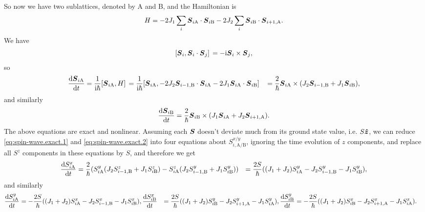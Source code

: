 \documentclass[hyperref, a4paper]{article}
\newcommand*{\ii}{\mathrm{i}}
\def\\{}%
\begin{document}
So now we have two sublattices, denoted by A and B, 
and the Hamiltonian is 
\begin{equation}
    H = - 2 J_1 \sum_i \vb*{S}_{i \text{A}} \cdot \vb*{S}_{i \text{B}} 
    - 2 J_2 \sum_i \vb*{S}_{i \text{B}} \cdot \vb*{S}_{i+1, \text{A}}.
\end{equation}
We have 
\[
    \comm*{\vb*{S}_i}{\vb*{S}_i \cdot \vb*{S}_j} = - \ii \vb*{S}_i \times \vb*{S}_j,
\]
so 
\begin{equation}
    \begin{aligned}
        \dv{\vb*{S}_{i \text{A}}}{t} &= \frac{1}{\ii \hbar} \comm*{\vb*{S}_{i \text{A}}}{H}
        = \frac{1}{\ii \hbar} \comm*{\vb*{S}_{i \text{A}}}{
            - 2 J_2 \vb*{S}_{i-1, \text{B}} \cdot \vb*{S}_{i \text{A}} 
            - 2 J_1 \vb*{S}_{i \text{A}} \cdot \vb*{S}_{i \text{B}} 
        } \\
        &= \frac{2}{\hbar} \vb*{S}_{i \text{A}} \times (
            J_2 \vb*{S}_{i-1, \text{B}} + 
            J_1 \vb*{S}_{i \text{B}}
        ),
    \end{aligned}
    \label{eq:spin-wave.exact.1}
\end{equation}
and similarly
\begin{equation}
    \dv{\vb*{S}_{i \text{B}}}{t} = 
    \frac{2}{\hbar} \vb*{S}_{i \text{B}} \times (
        J_1 \vb*{S}_{i \text{A}}
        + J_2 \vb*{S}_{i+1, \text{A}}
    ).
    \label{eq:spin-wave.exact.2}
\end{equation}
The above equations are exact and nonlinear. 
Assuming each $\vb*{S}$ doesn't deviate much from its ground state value, i.e. $S \vu*{z}$,
we can reduce \eqref{eq:spin-wave.exact.1} and \eqref{eq:spin-wave.exact.2} 
into four equations about 
$S^{x/y}_{i, \text{A}/\text{B}}$,
ignoring the time evolution of $z$ components,
and replace all $S^z$ components in these equations by $S$,
and therefore we get 
\[
    \begin{aligned}
        \dv{S^x_{i \text{A}}}{t} &= 
        \frac{2}{\hbar} (
            S^y_{i \text{A}} (J_2 S^z_{i-1, \text{B}} + J_1 S^z_{i \text{B}}) 
            - S^z_{i \text{A}} (J_2 S^y_{i-1, \text{B}} + J_1 S^y_{i \text{B}}) 
        ) \\
        &= \frac{2 S}{\hbar} (
            (J_1 + J_2) S^y_{i \text{A}}
            - J_2 S^y_{i-1, \text{B}}
            - J_1 S^y_{i \text{B}}
        ),
    \end{aligned}
\]
and similarly
\[
    \begin{aligned}
        \dv{S^y_{i \text{A}}}{t} &= - \frac{2 S}{\hbar} 
        (
            (J_1 + J_2) S^x_{i \text{A}}
            - J_2 S^x_{i - 1, \text{B}}
            - J_1 S^x_{i \text{B}}
        ), \\
        \dv{S^x_{i \text{B}}}{t} &= \frac{2 S}{\hbar} (
            (J_1 + J_2) S^y_{i \text{B}}
            - J_2 S^y_{i + 1, \text{A}}
            - J_1 S^y_{i \text{A}}
        ), \\
        \dv{S^y_{i \text{B}}}{t} &= - \frac{2 S}{\hbar} 
        (
            (J_1 + J_2) S^x_{i \text{B}}
            - J_2 S^x_{i + 1, \text{A}}
            - J_1 S^x_{i \text{A}}
        ).
    \end{aligned}
\]
\end{document}
